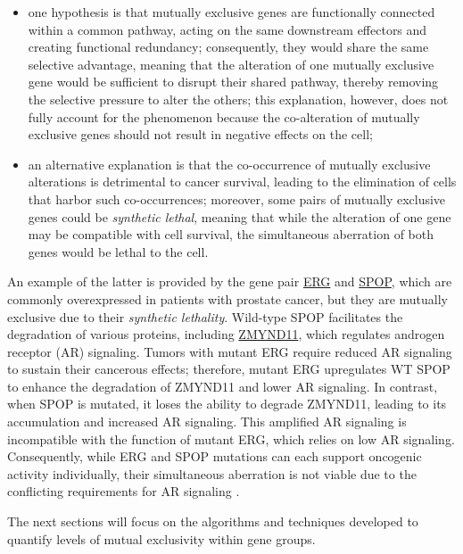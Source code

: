 \begin{itemize}
    \item one hypothesis is that mutually exclusive genes are functionally connected within a common pathway, acting on the same downstream effectors and creating functional redundancy; consequently, they would share the same selective advantage, meaning that the alteration of one mutually exclusive gene would be sufficient to disrupt their shared pathway, thereby removing the selective pressure to alter the others; this explanation, however, does not fully account for the phenomenon because the co-alteration of mutually exclusive genes should not result in negative effects on the cell;
    \item an alternative explanation is that the co-occurrence of mutually exclusive alterations is detrimental to cancer survival, leading to the elimination of cells that harbor such co-occurrences; moreover, some pairs of mutually exclusive genes could be \textit{synthetic lethal}, meaning that while the alteration of one gene may be compatible with cell survival, the simultaneous aberration of both genes would be lethal to the cell.
\end{itemize}

An example of the latter is provided by the gene pair \href{https://en.wikipedia.org/wiki/ERG_(gene)}{ERG} and \href{https://en.wikipedia.org/wiki/SPOP}{SPOP}, which are commonly overexpressed in patients with prostate cancer, but they are mutually exclusive due to their \textit{synthetic lethality}. Wild-type SPOP facilitates the degradation of various proteins, including \href{https://en.wikipedia.org/wiki/ZMYND11Jjla}{ZMYND11}, which regulates androgen receptor (AR) signaling. Tumors with mutant ERG require reduced AR signaling to sustain their cancerous effects; therefore, mutant ERG upregulates WT SPOP to enhance the degradation of ZMYND11 and lower AR signaling. In contrast, when SPOP is mutated, it loses the ability to degrade ZMYND11, leading to its accumulation and increased AR signaling. This amplified AR signaling is incompatible with the function of mutant ERG, which relies on low AR signaling. Consequently, while ERG and SPOP mutations can each support oncogenic activity individually, their simultaneous aberration is not viable due to the conflicting requirements for AR signaling \cite{erg_spop}.

The next sections will focus on the algorithms and techniques developed to quantify levels of mutual exclusivity within gene groups.

